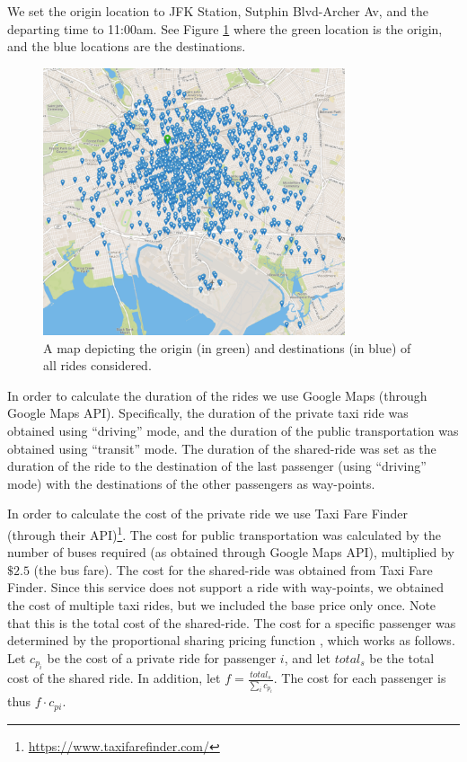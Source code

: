 \documentclass[letterpaper]{article} %
\begin{document}
We set the origin location to JFK Station, Sutphin Blvd-Archer Av, and the departing time to 11:00am. See Figure \ref{fig:destinations} where the green location is the origin, and the blue locations are the destinations.

\begin{figure}[hbpt]
\centering
\includegraphics[width=3.5in]{map2.pdf}
\caption{A map depicting the origin (in green) and destinations (in blue) of all rides considered.}
\label{fig:destinations}
\end{figure}

In order to calculate the duration of the rides we use Google Maps (through Google Maps API). Specifically, the duration of the private taxi ride was obtained using ``driving'' mode, and the duration of the public transportation was obtained using ``transit'' mode. The duration of the shared-ride was set as the duration of the ride to the destination of the last passenger (using ``driving'' mode) with the destinations of the other passengers as way-points.

In order to calculate the cost of the private ride we use Taxi Fare Finder (through their API)\footnote{\url{https://www.taxifarefinder.com/}}. The cost for public transportation was calculated by the number of buses required (as obtained through Google Maps API), multiplied by $\$2.5$ (the bus fare). The cost for the shared-ride was obtained from Taxi Fare Finder. Since this service does not support a ride with way-points, we obtained the cost of multiple taxi rides, but we included the base price only once. Note that this is the total cost of the shared-ride.
The cost for a specific passenger was determined by the proportional sharing pricing function \cite{fishburn1983fixed}, which works as follows. Let $c_{p_i}$ be the cost of a private ride for passenger $i$, and let $total_s$ be the total cost of the shared ride. In addition, let $f=\frac{total_s}{\sum_i c_{p_i}}$. The cost for each passenger is thus $f \cdot c_{pi}$.
\end{document}

